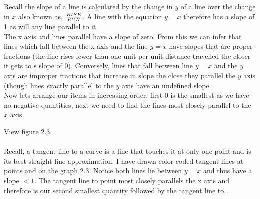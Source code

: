 \documentclass{article}
\begin{document}
\begin{enumerate}
Recall the slope of a line is calculated by the change in $y$ of a line over the change in $x$ also known as, $\frac{\text \bfseries RISE}{\text \bfseries RUN}$.
A line with the equation $y=x$ therefore has a slope of 1 as will any line parallel to it.\\ The x axis and lines parallel have a slope of zero. From this we can infer that lines which fall between the x axis and the line $y=x$ have slopes that are proper fractions (the line rises fewer than one unit per unit distance travelled the closer it gets to s slope of 0). Conversely, lines that fall between line $y=x$ and the $y$ axis are improper fractions that increase in slope the close they parallel the $y$ axis (though lines {\emph exactly} parallel to the $y$ axis have an undefined slope. \\

Now lets arrange our items in increasing order, first 0 is the smallest as we have no negative quantities, next we need to find the lines most closely parallel to the $x$ axis.

\pagebreak

View figure 2.3.\\
 \\ 

Recall, a tangent line to a curve is a line that touches it at only one point and is its best straight line approximation. I have drawn color coded tangent lines at points { \color{green}{B}} and {\color{blue}{C}} on the graph 2.3.  Notice both lines lie between {\color{red} $y=x$} and thus have a slope $< 1$. The tangent line to point {\color{blue}{C}} most closely parallels the x axis and therefore is our second smallest quantity followed by the tangent line to { \color{green}{B}}. \\


\end{enumerate}
\end{document}
